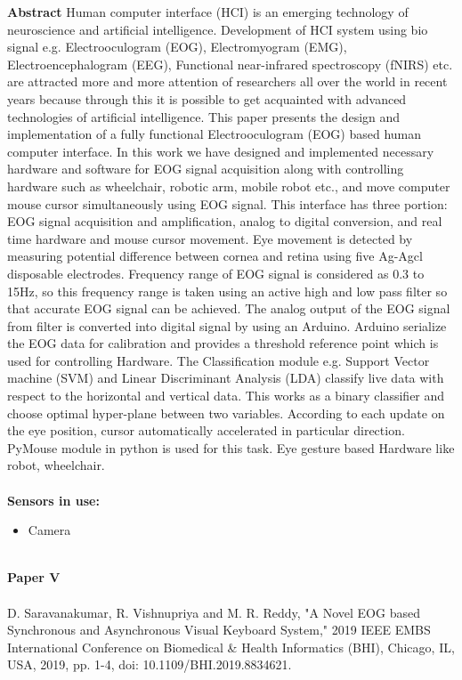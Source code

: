\noindent
\textbf{Abstract} Human computer interface (HCI) is an emerging technology of neuroscience and artificial intelligence. Development of HCI system using bio signal e.g. Electrooculogram (EOG), Electromyogram (EMG), Electroencephalogram (EEG), Functional near-infrared spectroscopy (fNIRS) etc. are attracted more and more attention of researchers all over the world in recent years because through this it is possible to get acquainted with advanced technologies of artificial intelligence. This paper presents the design and implementation of a fully functional Electrooculogram (EOG) based human computer interface. In this work we have designed and implemented necessary hardware and software for EOG signal acquisition along with controlling hardware such as wheelchair, robotic arm, mobile robot etc., and move computer mouse cursor simultaneously using EOG signal. This interface has three portion: EOG signal acquisition and amplification, analog to digital conversion, and real time hardware and mouse cursor movement. Eye movement is detected by measuring potential difference between cornea and retina using five Ag-Agcl disposable electrodes. Frequency range of EOG signal is considered as 0.3 to 15Hz, so this frequency range is taken using an active high and low pass filter so that accurate EOG signal can be achieved. The analog output of the EOG signal from filter is converted into digital signal by using an Arduino. Arduino serialize the EOG data for calibration and provides a threshold reference point which is used for controlling Hardware. The Classification module e.g. Support Vector machine (SVM) and Linear Discriminant Analysis (LDA) classify live data with respect to the horizontal and vertical data. This works as a binary classifier and choose optimal hyper-plane between two variables. According to each update on the eye position, cursor automatically accelerated in particular direction. PyMouse module in python is used for this task. Eye gesture based Hardware like robot, wheelchair.
\\ \\


\noindent
\textbf{Sensors in use:}
\begin{itemize}
    \item Camera \\ \\
\end{itemize}

\noindent
\textbf{Paper V} 
\\ \\
\noindent
D. Saravanakumar, R. Vishnupriya and M. R. Reddy, "A Novel EOG based Synchronous and Asynchronous Visual Keyboard System," 2019 IEEE EMBS International Conference on Biomedical & Health Informatics (BHI), Chicago, IL, USA, 2019, pp. 1-4, doi: 10.1109/BHI.2019.8834621.\\ \\


